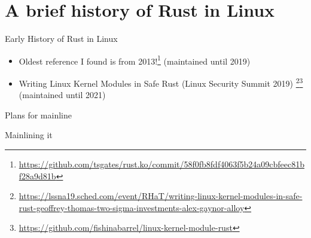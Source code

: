 \section{A brief history of Rust in Linux}

\begin{frame}[c]{Early History of Rust in Linux}
 \begin{itemize}
   \item Oldest reference I found is from 2013!\footnote{\url{https://github.com/tsgates/rust.ko/commit/58f0fb8fdf4063f5b24a09cbfeec81bf28a9d81b}}
     {\small (maintained until 2019)}
   \pause\item Writing Linux Kernel Modules in Safe Rust (Linux Security Summit 2019)
     \footnote{\url{https://lssna19.sched.com/event/RHaT/writing-linux-kernel-modules-in-safe-rust-geoffrey-thomas-two-sigma-investments-alex-gaynor-alloy}}\footnote{\url{https://github.com/fishinabarrel/linux-kernel-module-rust}}
     {\small (maintained until 2021)}
 \end{itemize}
\end{frame}

\begin{frame}[c]{Plans for mainline}
\end{frame}

\begin{frame}[c]{Mainlining it}
\end{frame}
